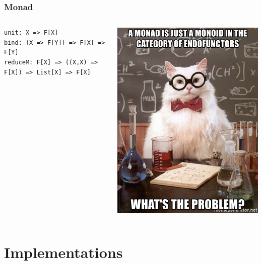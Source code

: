 \documentclass{beamer}
\begin{document}
\begin{frame}[fragile]
\frametitle{Monad}
\begin{columns}
\begin{column}{0.6\textwidth}
\begin{lstlisting}
unit: X => F[X]
bind: (X => F[Y]) => F[X] => F[Y]
reduceM: F[X] => ((X,X) => F[X]) => List[X] => F[X]
\end{lstlisting}
\end{column}
\begin{column}{0.4\textwidth}
\includegraphics[width=\textwidth]{cat_monad.jpg}
\end{column}
\end{columns}
\end{frame}


\section{Implementations}
\end{document}
